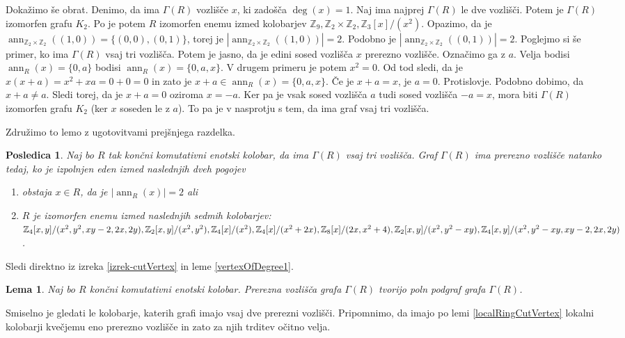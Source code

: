 \documentclass[a4paper, 12pt]{amsart}
\theoremstyle{definition} %
\theoremstyle{plain} %
\newtheorem{lema}[definicija]{Lema}
\newtheorem{posledica}[definicija]{Posledica}
\newcommand{\Z}{\mathbb Z}
\DeclareMathOperator{\ann}{ann}
\begin{document}
Dokažimo še obrat. Denimo, da ima $\Gamma(R)$ vozlišče $x$, ki zadošča $\deg(x)=1$. Naj ima najprej $\Gamma(R)$ le dve vozlišči. Potem je $\Gamma(R)$ izomorfen grafu $K_2$. Po \cite{Anderson-klasifikacijaMalihGrafov} je potem $R$ izomorfen enemu izmed kolobarjev $\Z_9, \Z_2 \times \Z_2, \Z_3[x]/(x^2)$. Opazimo, da je $\ann_{\Z_2 \times \Z_2}((1,0)) = \{(0,0), (0,1)\}$, torej je $|\ann_{\Z_2 \times \Z_2}((1,0))| = 2$. Podobno je $|\ann_{\Z_2 \times \Z_2}((0,1))| = 2$. 
Poglejmo si še primer, ko ima $\Gamma(R)$ vsaj tri vozlišča. Potem je jasno, da je edini sosed vozlišča $x$ prerezno vozlišče. Označimo ga z $a$. Velja bodisi $\ann_R(x) = \{0,a\}$ bodisi $\ann_R(x) = \{0,a,x\}$. V drugem primeru je potem $x^2 = 0$. Od tod sledi, da je $x(x+a) = x^2 + xa = 0 + 0 = 0$ in zato je $x+a \in \ann_R(x) = \{0,a,x\}$. Če je $x+a = x$, je $a=0$. Protislovje. Podobno dobimo, da $x+a\neq a$. Sledi torej, da je $x+a=0$ oziroma $x=-a$. Ker pa je vsak sosed vozlišča $a$ tudi sosed vozlišča $-a=x$, mora biti $\Gamma(R)$ izomorfen grafu $K_2$ (ker $x$ soseden le z $a$). To pa je v nasprotju s tem, da ima graf vsaj tri vozlišča.
\endproof

Združimo to lemo z ugotovitvami prejšnjega razdelka.

\begin{posledica}
Naj bo $R$ tak končni komutativni enotski kolobar, da ima $\Gamma(R)$ vsaj tri vozlišča. Graf $\Gamma(R)$ ima prerezno vozlišče natanko tedaj, ko je izpolnjen eden izmed naslednjih dveh pogojev
\begin{enumerate}
\item obstaja $x\in R$, da je $|\ann_R(x)| = 2$ ali
\item $R$ je izomorfen enemu izmed naslednjih sedmih kolobarjev: $\Z_4[x,y]/(x^2, y^2, \\xy-2,2x,2y), \Z_2[x,y]/(x^2,y^2), \Z_4[x]/(x^2),  \Z_4[x]/ (x^2+2x), \Z_8[x]/(2x,x^2 + 4), \Z_2[x,y]/(x^2, y^2 - xy), \Z_4[x,y]/(x^2, y^2 - xy, xy-2,2x,2y)$.
\end{enumerate}
\end{posledica}

\proof
Sledi direktno iz izreka \ref{izrek-cutVertex} in leme \ref{vertexOfDegree1}.
\endproof

\begin{lema}
Naj bo $R$ končni komutativni enotski kolobar. Prerezna vozlišča grafa $\Gamma(R)$ tvorijo poln podgraf grafa $\Gamma(R)$.
\end{lema}

\proof
Smiselno je gledati le kolobarje, katerih grafi imajo vsaj dve prerezni vozlišči. Pripomnimo, da imajo po lemi \ref{localRingCutVertex} lokalni kolobarji kvečjemu eno prerezno vozlišče in zato za njih trditev očitno velja.
\end{document}
